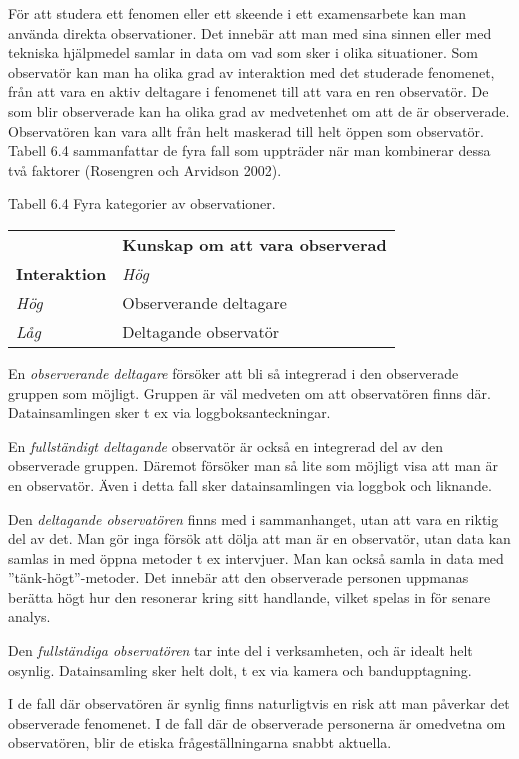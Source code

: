 För att studera ett fenomen eller ett skeende i ett examensarbete kan
man använda direkta observationer. Det innebär att man med sina sinnen
eller med tekniska hjälpmedel samlar in data om vad som sker i olika
situationer. Som observatör kan man ha olika grad av interaktion med det
studerade fenomenet, från att vara en aktiv deltagare i fenomenet till
att vara en ren observatör. De som blir observerade kan ha olika grad av
medvetenhet om att de är observerade. Observatören kan vara allt från
helt maskerad till helt öppen som observatör. Tabell 6.4 sammanfattar de
fyra fall som uppträder när man kombinerar dessa två faktorer (Rosengren
och Arvidson 2002).

Tabell 6.4 Fyra kategorier av observationer.

\begin{longtable}[]{@{}ll@{}}
\toprule
& \textbf{Kunskap om att vara observerad}\tabularnewline
\textbf{Interaktion} & \emph{Hög}\tabularnewline
\emph{Hög} & Observerande deltagare\tabularnewline
\emph{Låg} & Deltagande observatör\tabularnewline
\bottomrule
\end{longtable}

En \emph{observerande deltagare} försöker att bli så integrerad i den
observerade gruppen som möjligt. Gruppen är väl medveten om att
observatören finns där. Datainsamlingen sker t ex via
loggboksanteckningar.

En \emph{fullständigt deltagande} observatör är också en integrerad del
av den observerade gruppen. Däremot försöker man så lite som möjligt
visa att man är en observatör. Även i detta fall sker datainsamlingen
via loggbok och liknande.

Den \emph{deltagande observatören} finns med i sammanhanget, utan att
vara en riktig del av det. Man gör inga försök att dölja att man är en
observatör, utan data kan samlas in med öppna metoder t ex intervjuer.
Man kan också samla in data med ''tänk-högt''-metoder. Det innebär att
den observerade personen uppmanas berätta högt hur den resonerar kring
sitt handlande, vilket spelas in för senare analys.

Den \emph{fullständiga observatören} tar inte del i verksamheten, och är
idealt helt osynlig. Datainsamling sker helt dolt, t ex via kamera och
bandupptagning.

I de fall där observatören är synlig finns naturligtvis en risk att man
påverkar det observerade fenomenet. I de fall där de observerade
personerna är omedvetna om observatören, blir de etiska
frågeställningarna snabbt aktuella.

